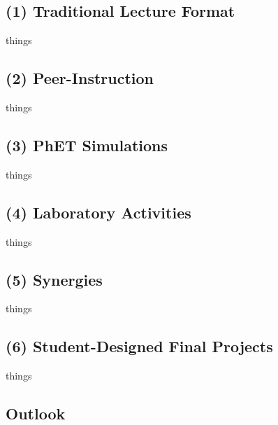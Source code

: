 \documentclass[../../../main.tex]{subfiles}
\begin{document}
\subsection{(1) Traditional Lecture Format}
things
\subsection{(2) Peer-Instruction}
things
\subsection{(3) PhET Simulations}
things
\subsection{(4) Laboratory Activities}
things
\subsection{(5) Synergies}
things
\subsection{(6) Student-Designed Final Projects}
things
\subsection{Outlook}
\end{document}
